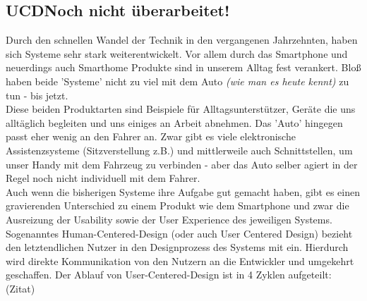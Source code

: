 \subsection{UCD\textbf{Noch nicht überarbeitet!}}

Durch den schnellen Wandel der Technik in den vergangenen Jahrzehnten, haben sich Systeme sehr stark weiterentwickelt. Vor allem durch das Smartphone und neuerdings auch Smarthome Produkte sind in unserem Alltag fest verankert. Bloß haben beide 'Systeme' nicht zu viel mit dem Auto \textit{(wie man es heute kennt)} zu tun - bis jetzt.\\
Diese beiden Produktarten sind Beispiele für Alltagsunterstützer, Geräte die uns alltäglich begleiten und uns einiges an Arbeit abnehmen. Das 'Auto' hingegen passt eher wenig an den Fahrer an. Zwar gibt es viele elektronische Assistenzsysteme (Sitzverstellung z.B.) und mittlerweile auch Schnittstellen, um unser Handy mit dem Fahrzeug zu verbinden - aber das Auto selber agiert in der Regel noch nicht individuell mit dem Fahrer.\\
Auch wenn die bisherigen Systeme ihre Aufgabe gut gemacht haben, gibt es einen gravierenden Unterschied zu einem Produkt wie dem Smartphone und zwar die Ausreizung der Usability sowie der User Experience des jeweiligen Systems. Sogenanntes Human-Centered-Design\cite{b23} (oder auch User Centered Design) bezieht den letztendlichen Nutzer in den Designprozess des Systems mit ein. Hierdurch wird direkte Kommunikation von den Nutzern an die Entwickler und umgekehrt geschaffen. Der Ablauf von User-Centered-Design ist in 4 Zyklen aufgeteilt: (Zitat)\\


